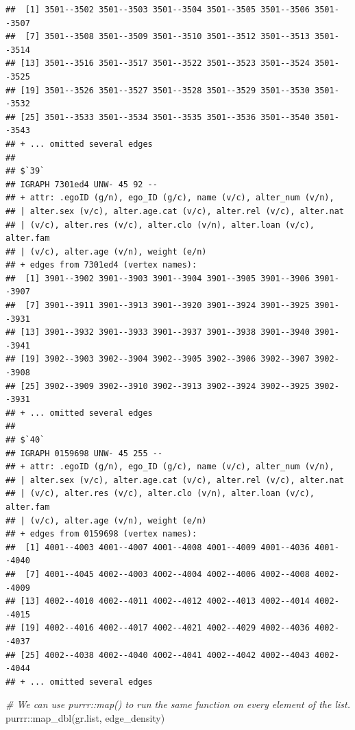 \documentclass[
]{book}
\newenvironment{Shaded}{\begin{snugshade}}{\end{snugshade}}
\newcommand{\CommentTok}[1]{\textcolor[rgb]{0.56,0.35,0.01}{\textit{#1}}}
\newcommand{\FunctionTok}[1]{\textcolor[rgb]{0.00,0.00,0.00}{#1}}
\newcommand{\NormalTok}[1]{#1}
\newcommand{\SpecialCharTok}[1]{\textcolor[rgb]{0.00,0.00,0.00}{#1}}
\begin{document}
\begin{verbatim}
##  [1] 3501--3502 3501--3503 3501--3504 3501--3505 3501--3506 3501--3507
##  [7] 3501--3508 3501--3509 3501--3510 3501--3512 3501--3513 3501--3514
## [13] 3501--3516 3501--3517 3501--3522 3501--3523 3501--3524 3501--3525
## [19] 3501--3526 3501--3527 3501--3528 3501--3529 3501--3530 3501--3532
## [25] 3501--3533 3501--3534 3501--3535 3501--3536 3501--3540 3501--3543
## + ... omitted several edges
## 
## $`39`
## IGRAPH 7301ed4 UNW- 45 92 -- 
## + attr: .egoID (g/n), ego_ID (g/c), name (v/c), alter_num (v/n),
## | alter.sex (v/c), alter.age.cat (v/c), alter.rel (v/c), alter.nat
## | (v/c), alter.res (v/c), alter.clo (v/n), alter.loan (v/c), alter.fam
## | (v/c), alter.age (v/n), weight (e/n)
## + edges from 7301ed4 (vertex names):
##  [1] 3901--3902 3901--3903 3901--3904 3901--3905 3901--3906 3901--3907
##  [7] 3901--3911 3901--3913 3901--3920 3901--3924 3901--3925 3901--3931
## [13] 3901--3932 3901--3933 3901--3937 3901--3938 3901--3940 3901--3941
## [19] 3902--3903 3902--3904 3902--3905 3902--3906 3902--3907 3902--3908
## [25] 3902--3909 3902--3910 3902--3913 3902--3924 3902--3925 3902--3931
## + ... omitted several edges
## 
## $`40`
## IGRAPH 0159698 UNW- 45 255 -- 
## + attr: .egoID (g/n), ego_ID (g/c), name (v/c), alter_num (v/n),
## | alter.sex (v/c), alter.age.cat (v/c), alter.rel (v/c), alter.nat
## | (v/c), alter.res (v/c), alter.clo (v/n), alter.loan (v/c), alter.fam
## | (v/c), alter.age (v/n), weight (e/n)
## + edges from 0159698 (vertex names):
##  [1] 4001--4003 4001--4007 4001--4008 4001--4009 4001--4036 4001--4040
##  [7] 4001--4045 4002--4003 4002--4004 4002--4006 4002--4008 4002--4009
## [13] 4002--4010 4002--4011 4002--4012 4002--4013 4002--4014 4002--4015
## [19] 4002--4016 4002--4017 4002--4021 4002--4029 4002--4036 4002--4037
## [25] 4002--4038 4002--4040 4002--4041 4002--4042 4002--4043 4002--4044
## + ... omitted several edges
\end{verbatim}

\begin{Shaded}
\begin{Highlighting}[]
\CommentTok{\# We can use purrr::map() to run the same function on every element of the list.}
\NormalTok{purrr}\SpecialCharTok{::}\FunctionTok{map\_dbl}\NormalTok{(gr.list, edge\_density)}
\end{Highlighting}
\end{Shaded}
\end{document}
